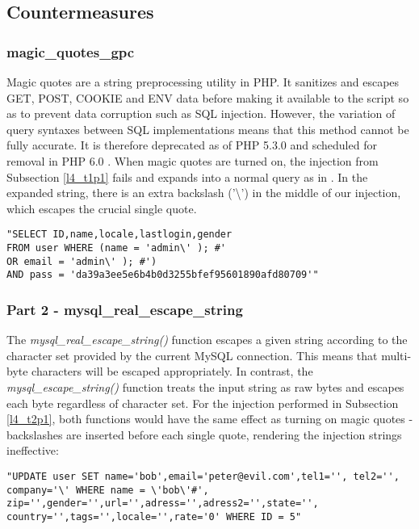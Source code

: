 \subsection{Countermeasures} \label{l4_t3}
\subsubsection{magic\_quotes\_gpc}
Magic quotes are a string preprocessing utility in PHP. It sanitizes and escapes GET, POST, COOKIE and ENV data before making it available to the script so as to prevent data corruption such as SQL injection. However, the variation of query syntaxes between SQL implementations means that this method cannot be fully accurate. It is therefore deprecated as of PHP 5.3.0 and scheduled for removal in PHP 6.0 \cite{Group2009}. When magic quotes are turned on, the injection from Subsection \ref{l4_t1p1} fails and expands into a normal query as in . In the expanded string, there is an extra backslash ('\textbackslash') in the middle of our injection, which escapes the crucial single quote.

\begin{minipage}{\linewidth}
\begin{lstlisting}[caption={Escaped injection expansion from Subsection \ref{l4_t1p1}},
label={lst:l4_t3p1_mq},
frame=single]
"SELECT ID,name,locale,lastlogin,gender
FROM user WHERE (name = 'admin\' ); #'
OR email = 'admin\' ); #')
AND pass = 'da39a3ee5e6b4b0d3255bfef95601890afd80709'"
\end{lstlisting}
\end{minipage}

\subsubsection{Part 2 - mysql\_real\_escape\_string}
The \emph{mysql\_real\_escape\_string()} function escapes a given string according to the character set provided by the current MySQL connection. This means that multi-byte characters will be escaped appropriately. In contrast, the \emph{mysql\_escape\_string()} function treats the input string as raw bytes and escapes each byte regardless of character set. For the injection performed in Subsection \ref{l4_t2p1}, both functions would have the same effect as turning on magic quotes - backslashes are inserted before each single quote, rendering the injection strings ineffective:

\begin{minipage}{\linewidth}
\begin{lstlisting}[caption={Escaped injection expansion from Subsection \ref{l4_t2p1}},
label={lst:l4_t3p2_compatkres},
frame=single]
"UPDATE user SET name='bob',email='peter@evil.com',tel1='', tel2='',
company='\' WHERE name = \'bob\'#',
zip='',gender='',url='',adress='',adress2='',state='',
country='',tags='',locale='',rate='0' WHERE ID = 5"
\end{lstlisting}
\end{minipage}


